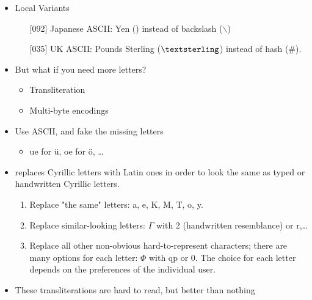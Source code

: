 \documentclass[a4paper,landscape,headrule,footrule,xetex]{foils}
\begin{document}
\begin{itemize}
\item Local Variants
  \begin{itemize}
  \item[{[092]}] Japanese ASCII: Yen ({}) instead of backslash
    ($\backslash$)
  \item[{[035]}] UK ASCII: Pounds Sterling ($\textsterling$) instead of hash (\#).
  \end{itemize}
\item But what if you need more letters?
  \begin{itemize}
  \item Transliteration
  \item Multi-byte encodings
  \end{itemize}
\end{itemize}








\begin{itemize}
\item Use ASCII, and fake the missing letters
  \begin{itemize}
  \item ue for \"u, oe for \"o, \ldots
  \end{itemize}
\item {} replaces Cyrillic letters with Latin ones in order to look the same as typed or handwritten Cyrillic letters.
  \begin{enumerate}
  \item Replace "the same" letters: a, e, K, M, T, o, y.
  \item    Replace similar-looking letters: $\Gamma$  with 2 (handwritten resemblance) or r,\ldots
  \item Replace all other non-obvious hard-to-represent characters;
    there are many options for each letter: $\Phi$ with qp or 0. The choice for each letter
    depends on the preferences of the individual user.
  \end{enumerate}
\item These transliterations are hard to read, but better than nothing
\end{itemize}
\end{document}
